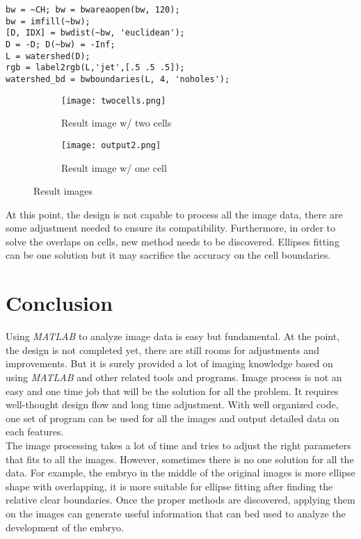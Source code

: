 \documentclass[12pt]{article}
\begin{document}
\begin{verbatim}
bw = ~CH; bw = bwareaopen(bw, 120);
bw = imfill(~bw);
[D, IDX] = bwdist(~bw, 'euclidean');
D = -D; D(~bw) = -Inf;
L = watershed(D);
rgb = label2rgb(L,'jet',[.5 .5 .5]);
watershed_bd = bwboundaries(L, 4, 'noholes');
\end{verbatim}

\begin{figure}[h!]
	\centering
    \begin{subfigure}[b]{0.4\textwidth}
    	\texttt{[image: twocells.png]}
        \caption{Result image w/ two cells}
        \label{fig:twocells}
	\end{subfigure}
    \begin{subfigure}[b]{0.4\textwidth}
    	\texttt{[image: output2.png]}
        \caption{Result image w/ one cell}
        \label{fig:onecell}
	\end{subfigure}
    \caption{Result images}\label{fig:result}
\end{figure}

\noindent \qquad At this point, the design is not capable to process all the image data, there are some adjustment needed to ensure its compatibility. Furthermore, in order to solve the overlaps on cells, new method needs to be discovered. Ellipses fitting can be one solution but it may sacrifice the accuracy on the cell boundaries. 

\newpage \section{Conclusion}

\qquad Using \textit{MATLAB} to analyze image data is easy but fundamental. At the point, the design is not completed yet, there are still rooms for adjustments and improvements. But it is surely provided a lot of imaging knowledge based on using \textit{MATLAB} and other related tools and programs. Image process is not an easy and one time job that will be the solution for all the problem. It requires well-thought design flow and long time adjustment. With well organized code, one set of program can be used for all the images and output detailed data on each features. \\

\noindent \qquad The image processing takes a lot of time and tries to adjust the right parameters that fits to all the images. However, sometimes there is no one solution for all the data. For example, the embryo in the middle of the original images is more ellipse shape with overlapping, it is more suitable for ellipse fitting after finding the relative clear boundaries. Once the proper methods are discovered, applying them on the images can generate useful information that can bed used to analyze the development of the embryo. \\
\end{document}

